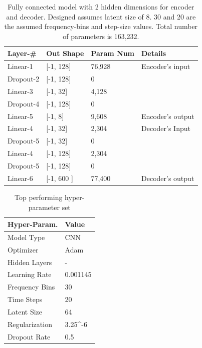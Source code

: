 \documentclass[runningheads,a4paper]{llncs}
\begin{document}
\begin{appendices}
\begin{table}[[h]

\begin{tabular}{|p{28mm}|p{25mm}|p{23mm}|p{50mm}|}
\hline
Layer-\# & Out Shape & Param Num & Details  \\ \hline
Linear-1 & [-1, 128]  & 76,928 & Encoder's input \\ \hline
Dropout-2 & [-1, 128] & 0 &  \\ \hline
Linear-3 & [-1, 32]  & 4,128 & \\ \hline
Dropout-4 & [-1, 128] & 0 &  \\ \hline
Linear-5 & [-1, 8] & 9,608 & Encoder's output \\ \hline
Linear-4 & [-1, 32] & 2,304 & Decoder's Input \\ \hline
Dropout-5 & [-1, 32]  & 0 &  \\ \hline
Linear-4 & [-1, 128] & 2,304 & \\ \hline
Dropout-5 & [-1, 128]  & 0 &  \\ \hline
Linear-6  & [-1, 600 ] &  77,400 &Decoder's output\\ \hline
\end{tabular}
\caption{Fully connected model with 2 hidden dimensions for encoder and decoder. Designed assumes latent size of 8. 30 and 20 are the assumed frequency-bins and step-size values. Total number of parameters is 163,232.}
\label{table:FC2_AUTOENCODER}
\end{table}
\begin{table}[htbp!]
\centering
\begin{tabular}{|p{6cm}|p{6cm}|}
\hline
Hyper-Param. & Value  \\ \hline
Model Type      &  CNN  \\ \hline
Optimizer       & Adam  \\ \hline
Hidden Layers   & -  \\\hline
Learning Rate   &  0.001145\\ \hline
Frequency Bins & 30 \\ \hline
Time Steps & 20 \\ \hline
Latent Size & 64 \\ \hline
Regularization & 3.25^{-6}\\ \hline
Dropout Rate & 0.5 \\ \hline
\end{tabular}
\caption{Top performing hyper-parameter set}
\label{table:best_params}
\end{table}

\end{appendices}
\end{document}

